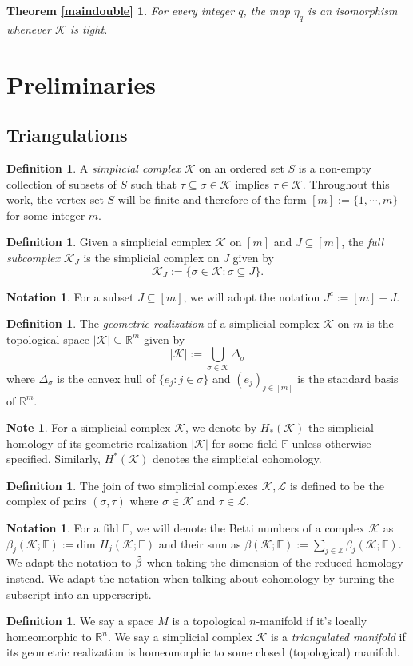 \documentclass[a4paper]{amsart}
\newtheorem*{thmb}{Theorem \ref{maindouble}}
\theoremstyle{definition}
\newtheorem{defin}[thm]{Definition}
\newtheorem{note}[thm]{Note}
\newtheorem{notation}[thm]{Notation}
\def\Z{\mathbb{Z}}    %
\def\K{\mathcal{K}}
\def\R{\mathbb{R}}
\def\Z{\mathbb{Z}}
\def\L{\mathcal{L}}
\def\F{\mathbb{F}}
\begin{document}
    \begin{thmb}
        For every integer $q$, the map $\eta_q$ is an isomorphism whenever $\K$ is tight.
    \end{thmb}

\section{Preliminaries}
\subsection{Triangulations}
\begin{defin}\label{simpdef}
    A \textit{simplicial complex} $\K$ on an ordered set $S$ is a non-empty collection of subsets of $S$ such that $\tau\subseteq\sigma\in \K$ implies $\tau\in\K$. Throughout this work, the vertex set $S$ will be finite and therefore of the form $[m]:=\{1,\cdots, m\}$ for some integer $m$. 
\end{defin}
\begin{defin}
    Given a simplicial complex $\K$ on $[m]$ and $J\subseteq [m]$, the \textit{full subcomplex} $\K_J$ is the simplicial complex on $J$ given by 
    \[\K_J:=\{\sigma\in\K:\sigma\subseteq J\}.\]
    \end{defin}
\begin{notation}
    For a subset $J\subseteq[m]$, we will adopt the notation $J^c:=[m]-J$.
\end{notation}
\begin{defin}
    The \textit{geometric realization} of a simplicial complex $\K$ on $m$ is the topological space $|\K|\subseteq \R^m$ given by
    \[|\K|:=\bigcup_{\sigma\in\K} \Delta_\sigma\]
    where $\Delta_\sigma$ is the convex hull of $\{e_j:j\in \sigma\}$ and $(e_j)_{j\in [m]}$ is the standard basis of $\R^m$.
\end{defin}

\begin{note}
    For a simplicial complex $\K$, we denote by $H_*(\K)$ the simplicial homology of its geometric realization $|\K|$ for some field $\F$ unless otherwise specified. Similarly, $H^*(\K)$ denotes the simplicial cohomology.
\end{note}
\begin{defin}
    The join of two simplicial complexes $\K, \L$ is defined to be the complex of pairs $(\sigma,\tau)$ where $\sigma\in \K$ and $\tau\in \L$.
\end{defin}
\begin{notation}
    For a fild $\F$, we will denote the Betti numbers of a complex $\K$ as $\beta_j(\K;\F):=\text{dim }H_j(\K;\F)$ and their sum as $\beta(\K;\F):=\sum\limits_{j\in\Z}\beta_j(\K;\F)$. We adapt the notation to $\Tilde{\beta}$ when taking the dimension of the reduced homology instead. We adapt the notation when talking about cohomology by turning the subscript into an upperscript.
\end{notation}
\begin{defin}
     We say a space $M$ is a topological $n$-manifold if it's locally homeomorphic to $\R^n$. We say a simplicial complex $\K$ is a \textit{triangulated manifold} if its geometric realization is homeomorphic to some closed (topological) manifold. 
\end{defin}
\end{document}
